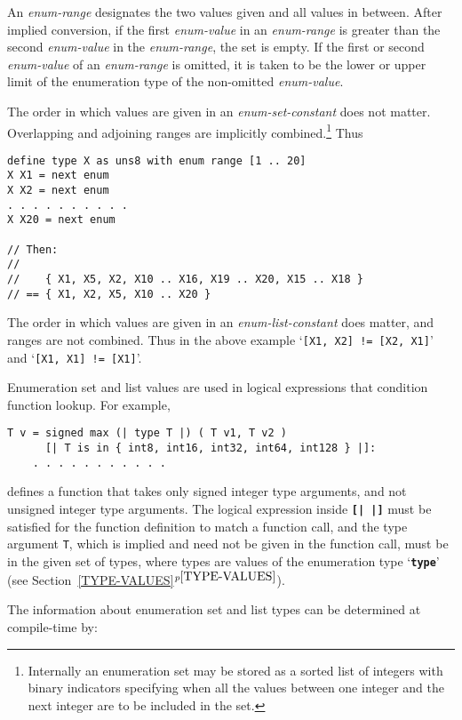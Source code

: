 \documentclass[12pt]{article}
\newcommand{\TT}[1]{{\tt \bfseries #1}}
\newcommand{\itemref}[1]{\ref{#1}$^{p\pageref{#1}}$}
\newenvironment{indpar}[1][0.3in]%
	{\begin{list}{}%
		     {\setlength{\itemsep}{0in}%
		      \setlength{\topsep}{0in}%
		      \setlength{\parsep}{1ex}%
		      \setlength{\labelwidth}{#1}%
		      \setlength{\leftmargin}{#1}%
		      \addtolength{\leftmargin}{\labelsep}}%
	 \item}%
	{\end{list}}
\begin{document}
An {\em enum-range} designates the two values given and all
values in between.
After implied conversion, if the first {\em enum-value} in an {\em enum-range}
is greater than the second {\em enum-value} in the {\em enum-range},
the set is empty.  If the first or second {\em enum-value} of
an {\em enum-range} is omitted, it is taken to be the lower or upper
limit of the enumeration type of the non-omitted {\em enum-value}.

The order in which values are given in an {\em enum-set-constant}
does not matter.  Overlapping and adjoining ranges are implicitly
combined.\footnote{Internally an enumeration set may be stored as a
sorted list of integers with binary indicators specifying when all
the values between one integer and the next integer are to be included
in the set.}
Thus
\begin{indpar}\begin{verbatim}
define type X as uns8 with enum range [1 .. 20]
X X1 = next enum
X X2 = next enum
. . . . . . . . . .
X X20 = next enum

// Then:
//
//    { X1, X5, X2, X10 .. X16, X19 .. X20, X15 .. X18 }
// == { X1, X2, X5, X10 .. X20 }
\end{verbatim}\end{indpar}

The order in which values are given in an {\em enum-list-constant}
does matter, and ranges are not combined.  Thus in the above
example `{\tt [X1, X2] != [X2, X1]}' and `{\tt [X1, X1] != [X1]}'.

Enumeration set and list values are used in logical expressions that
condition function lookup.  For example,
\begin{indpar}\begin{verbatim}
T v = signed max (| type T |) ( T v1, T v2 )
      [| T is in { int8, int16, int32, int64, int128 } |]:
    . . . . . . . . . . .
\end{verbatim}\end{indpar}

defines a function that takes only signed integer type
arguments, and not unsigned integer type arguments.
The logical expression inside \TT{[|~|]} must be satisfied
for the function definition to match a function call, and
the type argument {\tt T}, which is implied and need not be
given in the function call, must be in the given set of
types, where types are values of the enumeration type `\TT{type}'
(see Section~\itemref{TYPE-VALUES}).

The information about enumeration set and list types can be determined
at compile-time by:
\end{document}
